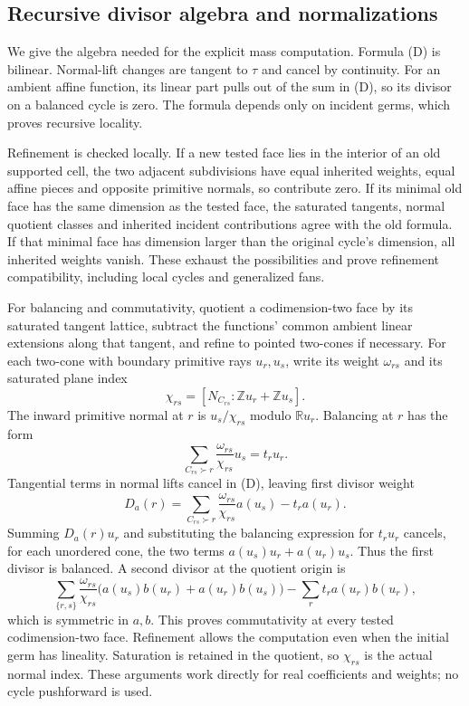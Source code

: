 \documentclass[
  11pt,
]{article}
\begin{document}
\subsection{Recursive divisor algebra and
normalizations}\label{recursive-divisor-algebra-and-normalizations}

We give the algebra needed for the explicit mass computation. Formula
(D) is bilinear. Normal-lift changes are tangent to \(\tau\) and cancel
by continuity. For an ambient affine function, its linear part pulls out
of the sum in (D), so its divisor on a balanced cycle is zero. The
formula depends only on incident germs, which proves recursive locality.

Refinement is checked locally. If a new tested face lies in the interior
of an old supported cell, the two adjacent subdivisions have equal
inherited weights, equal affine pieces and opposite primitive normals,
so contribute zero. If its minimal old face has the same dimension as
the tested face, the saturated tangents, normal quotient classes and
inherited incident contributions agree with the old formula. If that
minimal face has dimension larger than the original cycle's dimension,
all inherited weights vanish. These exhaust the possibilities and prove
refinement compatibility, including local cycles and generalized fans.

For balancing and commutativity, quotient a codimension-two face by its
saturated tangent lattice, subtract the functions' common ambient linear
extensions along that tangent, and refine to pointed two-cones if
necessary. For each two-cone with boundary primitive rays \(u_r,u_s\),
write its weight \(\omega_{rs}\) and its saturated plane index \[
\chi_{rs}=[N_{C_{rs}}:\mathbb Zu_r+\mathbb Zu_s].
\] The inward primitive normal at \(r\) is \(u_s/\chi_{rs}\) modulo
\(\mathbb Ru_r\). Balancing at \(r\) has the form \[
\sum_{C_{rs}\succ r}\frac{\omega_{rs}}{\chi_{rs}}u_s=t_ru_r.
\] Tangential terms in normal lifts cancel in (D), leaving first divisor
weight \[
D_a(r)=\sum_{C_{rs}\succ r}\frac{\omega_{rs}}{\chi_{rs}}a(u_s)-t_ra(u_r).
\] Summing \(D_a(r)u_r\) and substituting the balancing expression for
\(t_ru_r\) cancels, for each unordered cone, the two terms
\(a(u_s)u_r+a(u_r)u_s\). Thus the first divisor is balanced. A second
divisor at the quotient origin is \[
\sum_{\{r,s\}}\frac{\omega_{rs}}{\chi_{rs}}
\bigl(a(u_s)b(u_r)+a(u_r)b(u_s)\bigr)
-\sum_rt_ra(u_r)b(u_r),
\] which is symmetric in \(a,b\). This proves commutativity at every
tested codimension-two face. Refinement allows the computation even when
the initial germ has lineality. Saturation is retained in the quotient,
so \(\chi_{rs}\) is the actual normal index. These arguments work
directly for real coefficients and weights; no cycle pushforward is
used.
\end{document}
